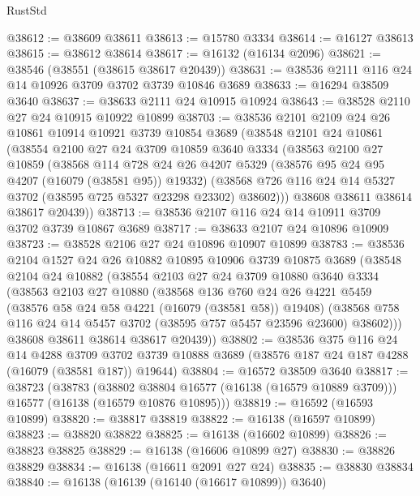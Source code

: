\begin{lexlean}{RustStd}
\begin{coremodule}
@38612 := @38609 @38611
@38613 := @15780 @3334
@38614 := @16127 @38613
@38615 := @38612 @38614
@38617 := @16132 (@16134 @2096)
@38621 := @38546 (@38551 (@38615 @38617 @20439))
@38631 := @38536 @2111 @116 @24 @14 @10926 @3709 @3702 @3739 @10846 @3689
@38633 := @16294 @38509 @3640
@38637 := @38633 @2111 @24 @10915 @10924
@38643 := @38528 @2110 @27 @24 @10915 @10922 @10899
@38703 := @38536
    @2101
    @2109
    @24
    @26
    @10861
    @10914
    @10921
    @3739
    @10854
    @3689
    (@38548
      @2101
      @24
      @10861
      (@38554
        @2100
        @27
        @24
        @3709
        @10859
        @3640
        @3334
        (@38563
          @2100
          @27
          @10859
          (@38568
            @114
            @728
            @24
            @26
            @4207
            @5329
            (@38576 @95 @24 @95 @4207 (@16079 (@38581 @95)) @19332)
            (@38568 @726 @116 @24 @14 @5327 @3702 (@38595 @725 @5327 @23298 @23302) @38602)))
        @38608
        @38611
        @38614
        @38617
        @20439))
@38713 := @38536 @2107 @116 @24 @14 @10911 @3709 @3702 @3739 @10867 @3689
@38717 := @38633 @2107 @24 @10896 @10909
@38723 := @38528 @2106 @27 @24 @10896 @10907 @10899
@38783 := @38536
    @2104
    @1527
    @24
    @26
    @10882
    @10895
    @10906
    @3739
    @10875
    @3689
    (@38548
      @2104
      @24
      @10882
      (@38554
        @2103
        @27
        @24
        @3709
        @10880
        @3640
        @3334
        (@38563
          @2103
          @27
          @10880
          (@38568
            @136
            @760
            @24
            @26
            @4221
            @5459
            (@38576 @58 @24 @58 @4221 (@16079 (@38581 @58)) @19408)
            (@38568 @758 @116 @24 @14 @5457 @3702 (@38595 @757 @5457 @23596 @23600) @38602)))
        @38608
        @38611
        @38614
        @38617
        @20439))
@38802 := @38536
    @375
    @116
    @24
    @14
    @4288
    @3709
    @3702
    @3739
    @10888
    @3689
    (@38576 @187 @24 @187 @4288 (@16079 (@38581 @187)) @19644)
@38804 := @16572 @38509 @3640
@38817 := @38723
    (@38783
      (@38802 @38804 @16577 (@16138 (@16579 @10889 @3709)))
      @16577
      (@16138 (@16579 @10876 @10895)))
@38819 := @16592 (@16593 @10899)
@38820 := @38817 @38819
@38822 := @16138 (@16597 @10899)
@38823 := @38820 @38822
@38825 := @16138 (@16602 @10899)
@38826 := @38823 @38825
@38829 := @16138 (@16606 @10899 @27)
@38830 := @38826 @38829
@38834 := @16138 (@16611 @2091 @27 @24)
@38835 := @38830 @38834
@38840 := @16138 (@16139 (@16140 (@16617 @10899)) @3640)

\end{coremodule}
\end{lexlean}
